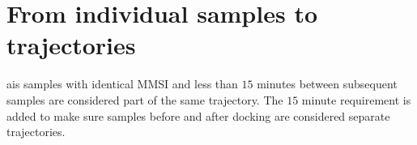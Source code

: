 \section{From individual samples to trajectories}\label{sec:from_ais_to_traj}
\acrshort{ais} samples with identical MMSI and less than $15$ minutes between subsequent samples are considered part of the same trajectory. The $15$ minute requirement is added to make sure samples before and after docking are considered separate trajectories.

